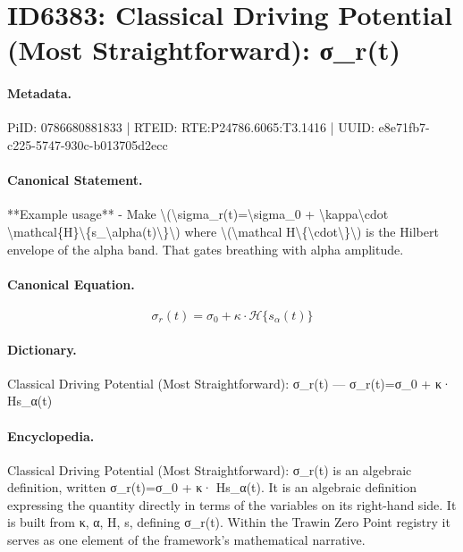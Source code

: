 \section*{ID6383: Classical Driving Potential (Most Straightforward): σ\_r(t)}
\paragraph{Metadata.}
PiID: 0786680881833 | RTEID: RTE:P24786.6065:T3.1416 | UUID: e8e71fb7-c225-5747-930c-b013705d2ecc

\paragraph{Canonical Statement.}
**Example usage** - Make \textbackslash{}(\textbackslash{}sigma\_r(t)=\textbackslash{}sigma\_0 + \textbackslash{}kappa\textbackslash{}cdot \textbackslash{}mathcal\{H\}\textbackslash{}\{s\_\textbackslash{}alpha(t)\textbackslash{}\}\textbackslash{}) where \textbackslash{}(\textbackslash{}mathcal H\textbackslash{}\{\textbackslash{}cdot\textbackslash{}\}\textbackslash{}) is the Hilbert envelope of the alpha band. That gates breathing with alpha amplitude.

\paragraph{Canonical Equation.}
\[
\sigma_r(t)=\sigma_0 + \kappa\cdot \mathcal{H}\{s_\alpha(t)\}
\]

\paragraph{Dictionary.}
Classical Driving Potential (Most Straightforward): σ\_r(t) — σ\_r(t)=σ\_0 + κ· Hs\_α(t)

\paragraph{Encyclopedia.}
Classical Driving Potential (Most Straightforward): σ\_r(t) is an algebraic definition, written σ\_r(t)=σ\_0 + κ· Hs\_α(t). It is an algebraic definition expressing the quantity directly in terms of the variables on its right-hand side. It is built from κ, α, H, s, defining σ\_r(t). Within the Trawin Zero Point registry it serves as one element of the framework's mathematical narrative.
